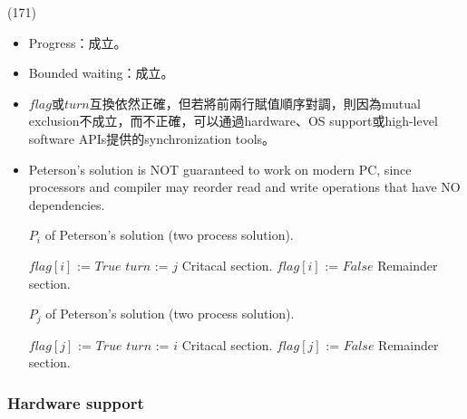 \begin{theorem}{(171)}
\begin{itemize}
\begin{itemize}
            \item Progress：成立。
            \item Bounded waiting：成立。 
            \item $flag$或$turn$互換依然正確，但若將前兩行賦值順序對調，則因為mutual exclusion不成立，而不正確，可以通過hardware、OS support或high-level software APIs提供的synchronization tools。
            \item Peterson's solution is NOT guaranteed to work on modern PC, since processors and compiler may reorder read and write operations that have NO dependencies.
            \begin{algorithm}[H]
                \caption{$P_i$ of Peterson's solution (two process solution).}
                \begin{algorithmic}[1]
                        \Repeat 
                            \State $flag[i]$ := $True$
                            \State $turn$ := $j$
                            \EndWhile
                            \State Critacal section.
                            \State $flag[i]$ := $False$
                            \State Remainder section.
                    \EndFunction
                \end{algorithmic}
            \end{algorithm}
            \begin{algorithm}[H]
                \caption{$P_j$ of Peterson's solution (two process solution).}
                \begin{algorithmic}[1]
                        \Repeat 
                            \State $flag[j]$ := $True$
                            \State $turn$ := $i$
                            \EndWhile
                            \State Critacal section.
                            \State $flag[j]$ := $False$
                            \State Remainder section.
                    \EndFunction
                \end{algorithmic}
            \end{algorithm}
        \end{itemize}
    \end{itemize}
\end{theorem}

\subsubsection{Hardware support}

